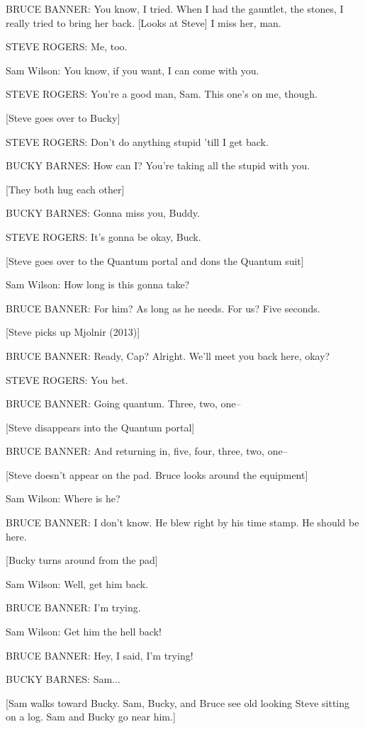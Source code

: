 BRUCE BANNER: You know, I tried. When I had the gauntlet, the stones, I really tried to bring her back. [Looks at Steve] I miss her, man.

STEVE ROGERS: Me, too.

Sam Wilson: You know, if you want, I can come with you.

STEVE ROGERS: You're a good man, Sam. This one's on me, though.

[Steve goes over to Bucky]

STEVE ROGERS: Don't do anything stupid 'till I get back.

BUCKY BARNES: How can I? You're taking all the stupid with you.

[They both hug each other]

BUCKY BARNES: Gonna miss you, Buddy.

STEVE ROGERS: It's gonna be okay, Buck.

[Steve goes over to the Quantum portal and dons the Quantum suit]

Sam Wilson: How long is this gonna take?

BRUCE BANNER: For him? As long as he needs. For us? Five seconds.

[Steve picks up Mjolnir (2013)]

BRUCE BANNER: Ready, Cap? Alright. We'll meet you back here, okay?

STEVE ROGERS: You bet.

BRUCE BANNER: Going quantum. Three, two, one–

[Steve disappears into the Quantum portal]

BRUCE BANNER: And returning in, five, four, three, two, one–

[Steve doesn't appear on the pad. Bruce looks around the equipment]

Sam Wilson: Where is he?

BRUCE BANNER: I don't know. He blew right by his time stamp. He should be here.

[Bucky turns around from the pad]

Sam Wilson: Well, get him back.

BRUCE BANNER: I'm trying.

Sam Wilson: Get him the hell back!

BRUCE BANNER: Hey, I said, I'm trying!

BUCKY BARNES: Sam...

[Sam walks toward Bucky. Sam, Bucky, and Bruce see old looking Steve sitting on a log. Sam and Bucky go near him.]

